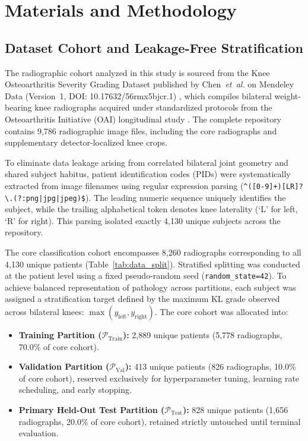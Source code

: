 \documentclass[10pt,journal]{IEEEtran}
\begin{document}
\section{Materials and Methodology}
\label{sec:methodology}

\subsection{Dataset Cohort and Leakage-Free Stratification}
\label{subsec:dataset}

The radiographic cohort analyzed in this study is sourced from the Knee Osteoarthritis Severity Grading Dataset published by Chen~\textit{et~al.} on Mendeley Data (Version~1, DOI: 10.17632/56rmx5bjcr.1) \cite{chen2018dataset}, which compiles bilateral weight-bearing knee radiographs acquired under standardized protocols from the Osteoarthritis Initiative (OAI) longitudinal study \cite{nevitt2006oai}. The complete repository contains 9,786 radiographic image files, including the core radiographs and supplementary detector-localized knee crops.

To eliminate data leakage arising from correlated bilateral joint geometry and shared subject habitus, patient identification codes (PIDs) were systematically extracted from image filenames using regular expression parsing (\texttt{\textasciicircum([0-9]+)[LR]?\textbackslash.(?:png|jpg|jpeg)\$}). The leading numeric sequence uniquely identifies the subject, while the trailing alphabetical token denotes knee laterality (`L' for left, `R' for right). This parsing isolated exactly 4,130 unique subjects across the repository.

The core classification cohort encompasses 8,260 radiographs corresponding to all 4,130 unique patients (Table~\ref{tab:data_split}). Stratified splitting was conducted at the patient level using a fixed pseudo-random seed (\texttt{random\_state=42}). To achieve balanced representation of pathology across partitions, each subject was assigned a stratification target defined by the maximum KL grade observed across bilateral knees: $\max(y_{\text{left}}, y_{\text{right}})$. The core cohort was allocated into:
\begin{itemize}[leftmargin=*]
\item \textbf{Training Partition ($\mathcal{P}_{\text{Train}}$):} 2,889 unique patients (5,778 radiographs, 70.0\% of core cohort).
\item \textbf{Validation Partition ($\mathcal{P}_{\text{Val}}$):} 413 unique patients (826 radiographs, 10.0\% of core cohort), reserved exclusively for hyperparameter tuning, learning rate scheduling, and early stopping.
\item \textbf{Primary Held-Out Test Partition ($\mathcal{P}_{\text{Test}}$):} 828 unique patients (1,656 radiographs, 20.0\% of core cohort), retained strictly untouched until terminal evaluation.
\end{itemize}
\end{document}
